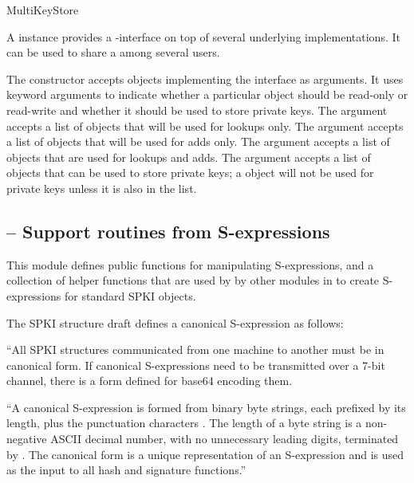 \documentclass{howto}
\begin{document}
\begin{classdesc}{MultiKeyStore}{}

A  instance provides a -interface
on top of several underlying  implementations.  It can
be used to share a  among several users.

The constructor accepts objects implementing the 
interface as arguments.  It uses keyword arguments to indicate whether
a particular object should be read-only or read-write and whether it
should be used to store private keys.  The  argument
accepts a list of objects that will be used for lookups only.  The
 argument accepts a list of objects that will be used for
adds only.  The  argument accepts a list of objects that are
used for lookups and adds.  The  argument accepts a list
of objects that can be used to store private keys; a 
object will not be used for private keys unless it is also in the
 list.

\end{classdesc}

\subsection{
	-- Support routines from S-expressions}

This module defines public functions for manipulating
S-expressions, and a collection of helper functions that are used by
by other modules in   to create S-expressions
for standard SPKI objects. 

The SPKI structure draft \cite{ellison99-structure} defines a
canonical S-expression as follows:

   ``All SPKI structures communicated from one machine to another must be
   in canonical form.  If canonical S-expressions need to be transmitted
   over a 7-bit channel, there is a form defined for base64 encoding
   them.

   ``A canonical S-expression is formed from binary byte strings, each
   prefixed by its length, plus the punctuation characters
   \code{()[]}.  The length of a byte string is a non-negative ASCII
   decimal number, with no unnecessary leading  digits,
   terminated by \code{:}.  The canonical  form is a unique
   representation of an S-expression and is used as the input to all
   hash and signature functions.'' 
\end{document}

